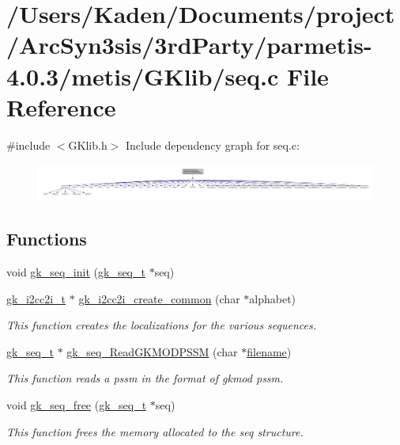\hypertarget{a00137}{}\section{/\+Users/\+Kaden/\+Documents/project/\+Arc\+Syn3sis/3rd\+Party/parmetis-\/4.0.3/metis/\+G\+Klib/seq.c File Reference}
\label{a00137}
{\ttfamily \#include $<$G\+Klib.\+h$>$}\newline
Include dependency graph for seq.\+c\+:\nopagebreak
\begin{figure}[H]
\begin{center}
\leavevmode
\includegraphics[width=350pt]{a00138}
\end{center}
\end{figure}
\subsection*{Functions}
\begin{DoxyCompactItemize}
\item 
void \hyperlink{a00137_aab063d2d2e459531af4b4adfbf208054}{gk\+\_\+seq\+\_\+init} (\hyperlink{a00674}{gk\+\_\+seq\+\_\+t} $\ast$seq)
\item 
\hyperlink{a00670}{gk\+\_\+i2cc2i\+\_\+t} $\ast$ \hyperlink{a00137_a8b9f1e33d58df397a7f0f923a25ec256}{gk\+\_\+i2cc2i\+\_\+create\+\_\+common} (char $\ast$alphabet)
\begin{DoxyCompactList}\small\item\em This function creates the localizations for the various sequences. \end{DoxyCompactList}\item 
\hyperlink{a00674}{gk\+\_\+seq\+\_\+t} $\ast$ \hyperlink{a00137_ad44124c9b40b8ffda2276f877526a261}{gk\+\_\+seq\+\_\+\+Read\+G\+K\+M\+O\+D\+P\+S\+SM} (char $\ast$\hyperlink{a00623_a42a21beb8018ac623f4d09db1343b9cf}{filename})
\begin{DoxyCompactList}\small\item\em This function reads a pssm in the format of gkmod pssm. \end{DoxyCompactList}\item 
void \hyperlink{a00137_ac3ecbea172370c2a661afecad60b5685}{gk\+\_\+seq\+\_\+free} (\hyperlink{a00674}{gk\+\_\+seq\+\_\+t} $\ast$seq)
\begin{DoxyCompactList}\small\item\em This function frees the memory allocated to the seq structure. \end{DoxyCompactList}\end{DoxyCompactItemize}


